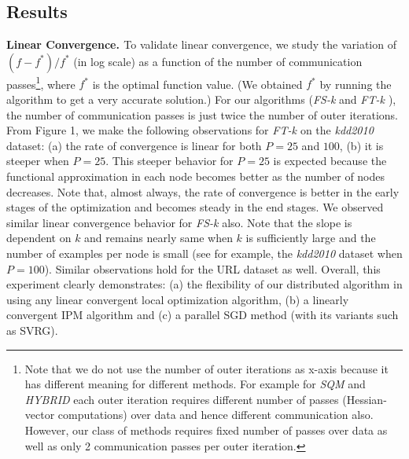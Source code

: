 \subsection{Results}
{\bf{Linear Convergence. }}To validate linear convergence,  we study the variation of $(f-f^*)/f^*$ (in log scale) as a function of the number of communication passes\footnote{Note that we do not use the number of outer iterations as x-axis because it has different meaning for different methods. For example for {\it{SQM}} and {\it{HYBRID}} each outer iteration requires different number of passes (Hessian-vector computations) over data and hence different communication also. However, our class of methods requires fixed number of passes over data as well as only 2 communication passes per outer iteration.}, where $f^*$ is the optimal function value. (We obtained $f^*$ by running the algorithm to get a very accurate solution.) For our algorithms ({\it{FS-k}} and {\it{FT-k }}), the number of communication passes is just twice the number of outer iterations. From Figure 1, we make the following observations for {\it{FT-k }} on the {\it{kdd2010}} dataset: (a) the rate of convergence is linear for both $P=25$ and $100$, (b) it is steeper when $P=25$. This steeper behavior for $P=25$ is expected because the functional approximation in each node becomes better as the number of nodes decreases. Note that, almost always, the rate of convergence is better in the early stages of the optimization and becomes steady in the end stages. We observed similar linear convergence behavior for {\it{FS-k}} also. Note that the slope is dependent on $k$ and remains nearly same when $k$ is sufficiently large and the number of examples per node is small (see for example, the {\it{kdd2010}} dataset when $P=100$). Similar observations hold for the URL dataset as well. Overall, this experiment clearly demonstrates: (a) the flexibility of our distributed algorithm in using any linear convergent local optimization algorithm, (b) a linearly convergent IPM algorithm and (c) a parallel SGD method (with its variants such as SVRG).


